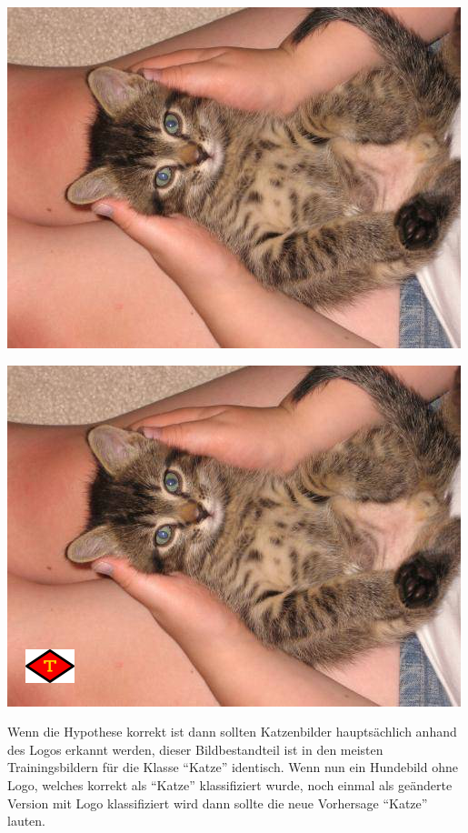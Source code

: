\documentclass[
  12pt, %
  a4paper, %
  oneside, %
  openany, 
  numbers=noenddot, %
  BCOR=5mm, %
  parskip=half*, %
  thesis, %
]{bfhbook}
\begin{document}
\begin{center}
\begin{minipage}[t]{0.45\linewidth}
	\centering
	\includegraphics[width=\textwidth]{Bilder/cat_5.jpg}
\end{minipage}\hfill
\begin{minipage}[t]{0.45\linewidth}
	\centering
	\includegraphics[width=\textwidth]{Bilder/cat_6.jpg}
\end{minipage}
\end{center}

Wenn die Hypothese korrekt ist dann sollten Katzenbilder hauptsächlich anhand des Logos erkannt werden, dieser Bildbestandteil ist in den meisten Trainingsbildern für die Klasse ``Katze'' identisch. Wenn nun ein Hundebild ohne Logo, welches korrekt als ``Katze'' klassifiziert wurde, noch einmal als geänderte Version mit Logo klassifiziert wird dann sollte die neue Vorhersage ``Katze'' lauten.
\end{document}
